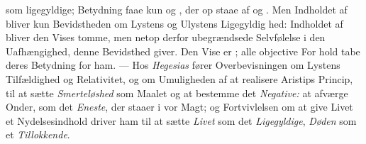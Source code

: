 som ligegyldige; Betydning faae kun  og , der op\-%
staae af  og . Men Indholdet af 
bliver kun Bevidstheden om Lystens og Ulystens Ligegyldig\-%
hed: Indholdet af  bliver den Vises tomme, men netop
derfor ubegrændsede Selvfølelse i den Uafhængighed, denne
Bevidsthed giver. Den Vise er ; alle objective For\-%
hold tabe deres Betydning for ham. --- Hos \emph{Hegesias} fører
Overbevisningen om Lystens Tilfældighed og Relativitet, og om
Umuligheden af at realisere Aristips Princip, til at sætte
\emph{Smerteløshed} som Maalet og at bestemme det \emph{Negative:}
at afværge Onder, som det \emph{Eneste}, der staaer i vor Magt;
og Fortvivlelsen om at give Livet et Nydelsesindhold driver
ham til at sætte \emph{Livet} som det \emph{Ligegyldige}, \emph{Døden} som
et \emph{Tillokkende}.

